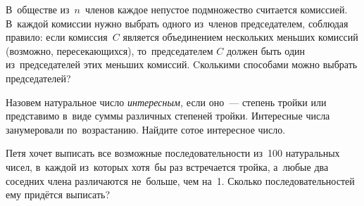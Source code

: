 \begin{problems}
\item
В~обществе из~$n$~членов каждое непустое подмножество считается комиссией.
В~каждой комиссии нужно выбрать одного из~членов председателем, соблюдая
правило: если комиссия~$C$ является объединением нескольких меньших комиссий
(возможно, пересекающихся), то~председателем $C$ должен быть один
из~председателей этих меньших комиссий.
Cколькими способами можно выбрать председателей?

\item
Назовем натуральное число \emph{интересным,} если оно~--- степень тройки или
представимо в~виде суммы различных степеней тройки.
Интересные числа занумеровали по~возрастанию.
Найдите сотое интересное число.

\item
Петя хочет выписать все возможные последовательности из~100 натуральных
чисел, в~каждой из~которых хотя~бы раз встречается тройка, а~любые два соседних
члена различаются не~больше, чем на~1.
Сколько последовательностей ему придётся выписать?

\end{problems}

